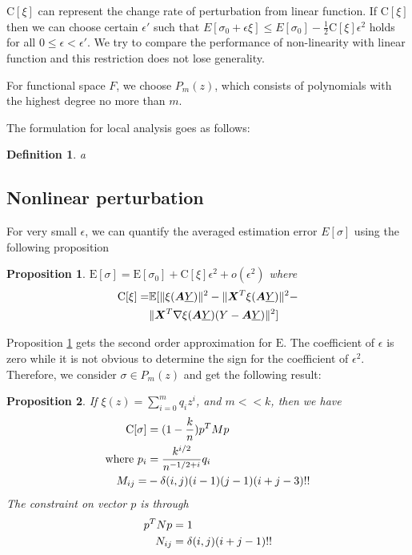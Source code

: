\documentclass[conference,letterpaper]{IEEEtran}
\newtheorem{definition}{Definition}
\newtheorem{proposition}{Proposition}
\DeclarePairedDelimiter\norm{\lVert}{\rVert}
\def\E{\mathbb{E}}
\begin{document}
$\mathrm{C}[\xi]$ can represent the change rate of perturbation from linear function. If $\mathrm{C}[\xi]$ then we can choose certain $\epsilon'$ such that $E[\sigma_0 + \epsilon \xi] \leq E[\sigma_0] - \frac{1}{2}\mathrm{C}[\xi]\epsilon^2$ holds for all $0\leq \epsilon < \epsilon'$.
We try to compare the performance of non-linearity with linear function and this restriction does not lose generality.


For functional space $F$, we choose $P_m(z)$,
which consists of polynomials with the highest degree no more than $m$.

The formulation for local analysis goes as follows:
\begin{definition}
a
\end{definition}

\subsection{Nonlinear perturbation}
For very small $\epsilon$, we can quantify the averaged estimation error $E[\sigma]$ using the
following proposition
\begin{proposition}\label{prop:Esigma}
$\mathrm{E}[\sigma] = \mathrm{E}[\sigma_0] +
\mathrm{C}[\xi]\epsilon^2 + o(\epsilon^2)$
where
\begin{align}\notag
\mathrm{C}[\xi]= & \E[\norm{\xi(\bm{A}\underline{Y})}^2 -
\norm{\bm{X}^T\xi(\bm{A}\underline{Y})}^2 - \\
&\norm{\bm{X}^T \nabla\xi(\bm{A}\underline{Y})(Y-\bm{A}\underline{Y})}^2]
\end{align}
\end{proposition}
Proposition \ref{prop:Esigma} gets the second order approximation for $\mathrm{E}$.
The coefficient of $\epsilon$ is zero while it is not obvious to determine the sign for 
the coefficient of $\epsilon^2$. Therefore, we consider $\sigma \in P_m(z)$ and
get the following result:
\begin{proposition}\label{prop:quadratic}
If
$\xi(z) = \sum_{i=0}^m q_i z^i$,
and $m << k$, then we have 
\begin{align}
\mathrm{C}[\sigma] &= (1-\frac{k}{n}) p^T M p \notag\\
\textrm{where }p_i &= \frac{k^{i/2}}{n^{- 1/2 + i}}q_i \notag\\
M_{ij} =& -\delta(i,j)(i-1)(j-1)(i+j-3)!! 
\end{align}
The constraint on vector $p$ is through
\begin{align}
p^T N p & = 1 \notag\\
N_{ij}  & = \delta(i,j)(i+j-1)!!
\end{align}
\end{proposition}
\end{document}

